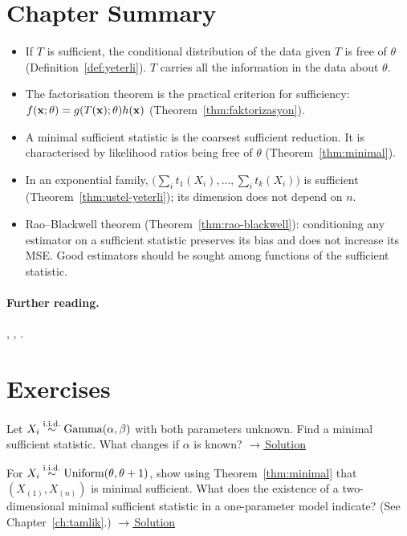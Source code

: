 \documentclass[main.tex]{subfiles}
\begin{document}
\section{Chapter Summary}
\begin{summary}
\begin{itemize}
  \item If $T$ is sufficient, the conditional distribution of the data given $T$ is free of $\theta$ (Definition~\ref{def:yeterli}). $T$ carries all the information in the data about $\theta$.
  \item The factorisation theorem is the practical criterion for sufficiency: $f(\mathbf{x};\theta)=g(T(\mathbf{x});\theta)h(\mathbf{x})$ (Theorem~\ref{thm:faktorizasyon}).
  \item A minimal sufficient statistic is the coarsest sufficient reduction. It is characterised by likelihood ratios being free of $\theta$ (Theorem~\ref{thm:minimal}).
  \item In an exponential family, $\big(\sum_it_1(X_i),\dots,\sum_it_k(X_i)\big)$ is sufficient (Theorem~\ref{thm:ustel-yeterli}); its dimension does not depend on $n$.
  \item Rao--Blackwell theorem (Theorem~\ref{thm:rao-blackwell}): conditioning any estimator on a sufficient statistic preserves its bias and does not increase its MSE. Good estimators should be sought among functions of the sufficient statistic.
\end{itemize}
\end{summary}

\paragraph{Further reading.} \cite[Chapter~6]{casella}, \cite[Section~1.6]{lehmann-casella}, \cite[Chapter~2]{shao}.

\section{Exercises}

\begin{exercise}\label{exr:09-1}
Let $X_i\overset{\text{i.i.d.}}{\sim}\text{Gamma}(\alpha,\beta)$ with both parameters unknown. Find a minimal sufficient statistic. What changes if $\alpha$ is known?
\hfill\hyperref[coz:09-1]{\footnotesize$\rightarrow$\,Solution}
\end{exercise}

\begin{exercise}\label{exr:09-2}
For $X_i\overset{\text{i.i.d.}}{\sim}\text{Uniform}(\theta,\theta+1)$, show using Theorem~\ref{thm:minimal} that $(X_{(1)},X_{(n)})$ is minimal sufficient. What does the existence of a two-dimensional minimal sufficient statistic in a one-parameter model indicate? (See Chapter~\ref{ch:tamlik}.)
\hfill\hyperref[coz:09-2]{\footnotesize$\rightarrow$\,Solution}
\end{exercise}
\end{document}
